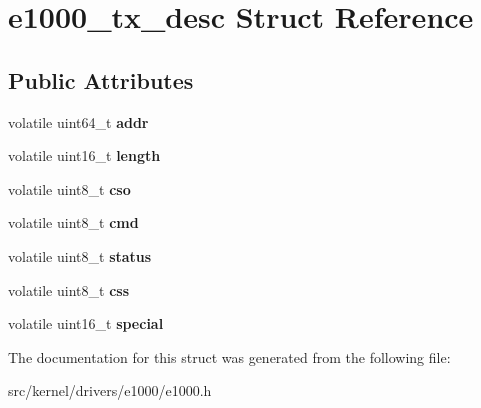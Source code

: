 \hypertarget{structe1000__tx__desc}{}\section{e1000\+\_\+tx\+\_\+desc Struct Reference}
\label{structe1000__tx__desc}
\subsection*{Public Attributes}
\begin{DoxyCompactItemize}
\item 
\mbox{\label{structe1000__tx__desc_aa47a8cfea5d9afc2d0751615aad7d5b0}} 
volatile uint64\+\_\+t {\bfseries addr}
\item 
\mbox{\label{structe1000__tx__desc_a410f70f69e817adeac128eda97543fef}} 
volatile uint16\+\_\+t {\bfseries length}
\item 
\mbox{\label{structe1000__tx__desc_a807a50149d88376ea5d17c8f4a42c75f}} 
volatile uint8\+\_\+t {\bfseries cso}
\item 
\mbox{\label{structe1000__tx__desc_af8aa75e3b925457db8aec8df5d28fab0}} 
volatile uint8\+\_\+t {\bfseries cmd}
\item 
\mbox{\label{structe1000__tx__desc_a3e5cf6634312d83a0860810ec2dfc17d}} 
volatile uint8\+\_\+t {\bfseries status}
\item 
\mbox{\label{structe1000__tx__desc_a387942d82f33e30603f493a141ea7bdc}} 
volatile uint8\+\_\+t {\bfseries css}
\item 
\mbox{\label{structe1000__tx__desc_a8a4f48429298f91cda0aa8949ecadd82}} 
volatile uint16\+\_\+t {\bfseries special}
\end{DoxyCompactItemize}


The documentation for this struct was generated from the following file\+:\begin{DoxyCompactItemize}
\item 
src/kernel/drivers/e1000/e1000.\+h\end{DoxyCompactItemize}
